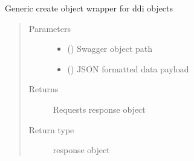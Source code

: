 \documentclass[letterpaper,10pt,english]{sphinxmanual}
\begin{document}
\begin{fulllineitems}
\begin{fulllineitems}
\begin{quote}
\begin{description}
\end{description}\end{quote}

\end{fulllineitems}


\begin{fulllineitems}
\label{\detokenize{b1oph-class:bloxone.b1oph.oph_uptime}}
\end{fulllineitems}


\begin{fulllineitems}
\label{\detokenize{b1oph-class:bloxone.b1oph.patch}}
\sphinxAtStartPar
Generic create object wrapper for ddi objects
\begin{quote}\begin{description}
\item[{Parameters}] \leavevmode\begin{itemize}
\item {} 
\sphinxAtStartPar
{} () \textendash{} Swagger object path

\item {} 
\sphinxAtStartPar
{} () \textendash{} JSON formatted data payload

\end{itemize}

\item[{Returns}] \leavevmode
\sphinxAtStartPar
Requests response object

\item[{Return type}] \leavevmode
\sphinxAtStartPar
response object

\end{description}\end{quote}


\end{fulllineitems}
\end{fulllineitems}
\end{document}
